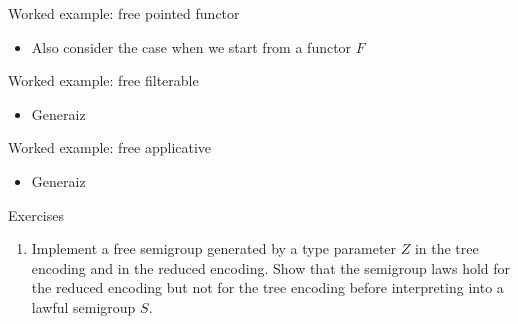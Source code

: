 \documentclass[english,,russian]{beamer}
\begin{document}
\begin{frame}{Worked example: free pointed functor}
\begin{itemize}
\item Also consider the case when we start from a functor $F$
\end{itemize}
\end{frame}

\begin{frame}{Worked example: free filterable}
\begin{itemize}
\item Generaiz
\end{itemize}
\end{frame}

\begin{frame}{Worked example: free applicative}
\begin{itemize}
\item Generaiz
\end{itemize}
\end{frame}

\begin{frame}{Exercises}
\begin{enumerate}
\item {\footnotesize{}\vspace{-0.15cm}Implement a free semigroup generated
by a type parameter $Z$ in the tree encoding and in the reduced encoding.
Show that the semigroup laws hold for the reduced encoding but not
for the tree encoding before interpreting into a lawful semigroup
$S$.}{\footnotesize\par}
\end{enumerate}
\end{frame}
\end{document}
